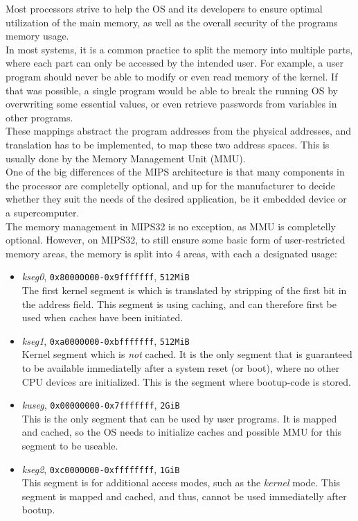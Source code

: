 Most processors strive to help the OS and its developers to ensure optimal
utilization of the main memory, as well as the overall security of the programs
memory usage.\\
In most systems, it is a common practice to split the memory into multiple
parts, where each part can only be accessed by the intended user. For example,
a user program should never be able to modify or even read memory of the kernel.
If that was possible, a single program would be able to break the running OS by
overwriting some essential values, or even retrieve passwords from variables in
other programs.\\
These mappings abstract the program addresses from the physical addresses, and
translation has to be implemented, to map these two address spaces. This is
usually done by the Memory Management Unit (MMU).\\
One of the big differences of the MIPS architecture is that many components in
the processor are completelly optional, and up for the manufacturer to decide
whether they suit the needs of the desired application, be it embedded device
or a supercomputer.\\
The memory management in MIPS32 is no exception, as MMU is completelly optional.
However, on MIPS32, to still ensure some basic form of user-restricted memory areas, the
memory is split into 4 areas, with each a designated
usage:\cite{imgtec:Memory_Map}\cite{see_mips_run}
\begin{itemize}
\item \textit{kseg0}, \texttt{0x80000000-0x9fffffff}, \texttt{512MiB}\\
The first kernel segment is which is translated by stripping of the first bit
in the address field. This segment is using caching, and can therefore first
be used when caches have been initiated.\cite{see_mips_run}
\item \textit{kseg1}, \texttt{0xa0000000-0xbfffffff}, \texttt{512MiB}\\
Kernel segment which is \textit{not} cached. It is the only segment that is
guaranteed to be available immediatelly after a system reset (or boot), where
no other CPU devices are initialized.
This is the segment where bootup-code is stored.
\item \textit{kuseg}, \texttt{0x00000000-0x7fffffff}, \texttt{2GiB}\\
This is the only segment that can be used by user programs. It is mapped and
cached, so the OS needs to initialize caches and possible MMU for this segment
to be useable.
\item \textit{kseg2}, \texttt{0xc0000000-0xffffffff}, \texttt{1GiB}\\
This segment is for additional access modes, such as the \textit{kernel}
mode. This segment is mapped and cached, and thus, cannot be used immediatelly after
bootup.
\end{itemize}

